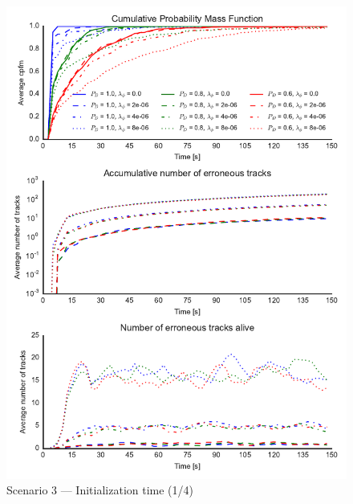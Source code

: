 \begin{figure}
\centering
\includegraphics{Figures/plots/Scenario3_Init-Time(1-4).pdf}
\caption{Scenario 3 --- Initialization time (1/4)}\label{fig:init3_time_1-4}
\end{figure}

